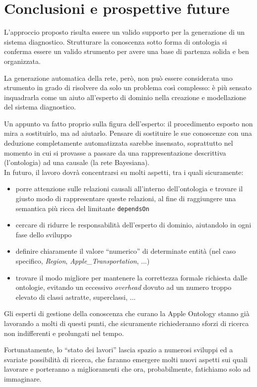 \chapter{Conclusioni e prospettive future}

L'approccio proposto risulta essere un valido supporto per la generazione di un sistema diagnostico.
Strutturare la conoscenza sotto forma di ontologia si conferma essere un valido strumento per avere una base di partenza solida e ben organizzata. 

La generazione automatica della rete, però, non può essere considerata uno strumento in grado di risolvere da solo un problema così complesso: è più sensato inquadrarla come un aiuto all'esperto di dominio nella creazione e modellazione del sistema diagnostico. 

Un appunto va fatto proprio sulla figura dell'esperto: il procedimento esposto non mira a sostituirlo, ma ad aiutarlo. Pensare di sostituire le sue conoscenze con una deduzione completamente automatizzata sarebbe insensato, soprattutto nel momento in cui si provasse a passare da una rappresentazione descrittiva (l'ontologia) ad una causale (la rete Bayesiana).
\\
In futuro, il lavoro dovrà concentrarsi su molti aspetti, tra i quali sicuramente:
\begin{itemize}
	\item porre attenzione sulle relazioni causali all'interno dell'ontologia e trovare il giusto modo di rappresentare queste relazioni, al fine di raggiungere una semantica più ricca del limitante \texttt{dependsOn}
	\item cercare di ridurre le responsabilità dell'esperto di dominio, aiutandolo in ogni fase dello sviluppo 
	\item definire chiaramente il valore ``numerico'' di determinate entità (nel caso specifico, \textit{Region}, \textit{Apple\_Transportation}, ...)
	\item trovare il modo migliore per mantenere la correttezza formale richiesta dalle ontologie, evitando un eccessivo \textit{overhead} dovuto ad un numero troppo elevato di classi astratte, superclassi, ...
\end{itemize}

Gli esperti di gestione della conoscenza che curano la Apple Ontology stanno già lavorando a molti di questi punti, che sicuramente richiederanno sforzi di ricerca non indifferenti e prolungati nel tempo. 

Fortunatamente, lo ``stato dei lavori'' lascia spazio a numerosi sviluppi ed a svariate possibilità di ricerca, che faranno emergere molti nuovi aspetti sui quali lavorare e porteranno a miglioramenti che ora, probabilmente, fatichiamo solo ad immaginare.
